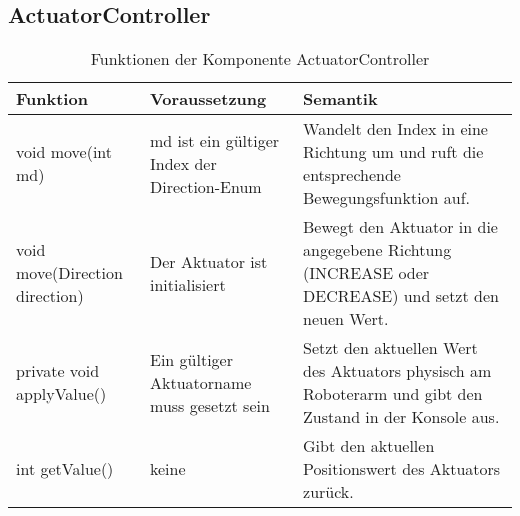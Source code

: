 \clearpage
    \subsection{ActuatorController}
        \begin{table}[h!]
            \centering
            \begin{tabular}{|p{5cm}|p{5cm}|p{5cm}|}
                \hline
                \textbf{Funktion} & \textbf{Voraussetzung} & \textbf{Semantik} \\
                \hline
                void move(int md) & md ist ein gültiger Index der Direction-Enum & Wandelt den Index in eine Richtung um und ruft die entsprechende Bewegungsfunktion auf. \\
                \hline
                void move(Direction direction) & Der Aktuator ist initialisiert & Bewegt den Aktuator in die angegebene Richtung (INCREASE oder DECREASE) und setzt den neuen Wert. \\
                \hline
                private void applyValue() & Ein gültiger Aktuatorname muss gesetzt sein & Setzt den aktuellen Wert des Aktuators physisch am Roboterarm und gibt den Zustand in der Konsole aus. \\
                \hline
                int getValue() & keine & Gibt den aktuellen Positionswert des Aktuators zurück. \\
                \hline
            \end{tabular}
            \caption{Funktionen der Komponente ActuatorController}
            \label{tab:ActuatorController}
        \end{table}


